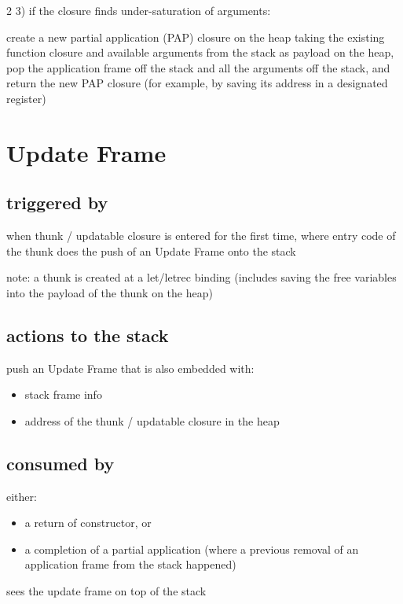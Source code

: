 \documentclass[8pt]{extarticle}
\begin{document}
\begin{multicols*}{2}
  3) if the closure finds under-saturation of arguments:

  create a new partial application (PAP) closure on the heap taking the existing function closure and available arguments from the stack as payload on the heap, pop the application frame off the stack and all the arguments off the stack, and return the new PAP closure (for example, by saving its address in a designated register)
  
  \vfill\null
  \columnbreak

  \section{Update Frame}

  \subsection{triggered by}

  when thunk / updatable closure is entered for the first time, where entry code of the thunk does the push of an Update Frame onto the stack

  note: a thunk is created at a let/letrec binding (includes saving the free variables into the payload of the thunk on the heap)

  \subsection{actions to the stack}

  push an Update Frame that is also embedded with:
  \begin{itemize}
  \item stack frame info
  \item address of the thunk / updatable closure in the heap
  \end{itemize}

  \subsection{consumed by}

  either:
  \begin{itemize}
  \item a return of constructor, or
  \item a completion of a partial application (where a previous removal of an application frame from the stack happened)
  \end{itemize}
  sees the update frame on top of the stack


\end{multicols*}
\end{document}
